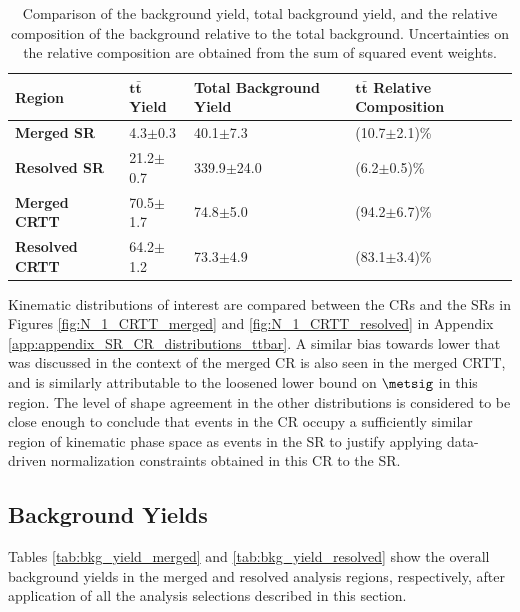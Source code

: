 \begin{table}[htbp]
    \centering
    \caption{Comparison of the \ttbar background yield, total background yield, and the relative composition of the \ttbar background relative to the total background. Uncertainties on the relative composition are obtained from the sum of squared event weights.}
    \begin{tabular}{l l l l}
      \toprule
     \textbf{Region} & \(\boldsymbol{t\bar{t}}\)\textbf{ Yield} & \textbf{Total Background Yield} & \(\boldsymbol{t\bar{t}}\)\textbf{ Relative Composition} \\
      \midrule
      \midrule
      \textbf{Merged SR} & 4.3\(\pm\)0.3 & 40.1\(\pm\)7.3 & (10.7\(\pm\)2.1)\%  \tabularnewline
      \midrule
      \textbf{Resolved SR} & 21.2\(\pm\)0.7 & 339.9\(\pm\)24.0 & (6.2\(\pm\)0.5)\% \tabularnewline
      \midrule
      \textbf{Merged CRTT} & 70.5\(\pm\)1.7 & 74.8\(\pm\)5.0 & (94.2\(\pm\)6.7)\% \tabularnewline
      \midrule
      \textbf{Resolved CRTT} & 64.2\(\pm\)1.2 & 73.3\(\pm\)4.9 & (83.1\(\pm\)3.4)\% \tabularnewline
      \bottomrule
    \end{tabular}
    \label{tab:ttbar_cr_yields}
\end{table}

Kinematic distributions of interest are compared between the \ttbar CRs and the SRs in Figures \ref{fig:N_1_CRTT_merged} and \ref{fig:N_1_CRTT_resolved} in Appendix \ref{app:appendix_SR_CR_distributions_ttbar}. A similar bias towards lower \met that was discussed in the context of the merged \wjets CR is also seen in the merged CRTT, and is similarly attributable to the loosened lower bound on \(\metsig\) in this region. The level of shape agreement in the other distributions is considered to be close enough to conclude that events in the \ttbar CR occupy a sufficiently similar region of kinematic phase space as events in the SR to justify applying data-driven \ttbar normalization constraints obtained in this CR to the SR.

\subsection{Background Yields}
\label{ap:bkg_yields}

Tables \ref{tab:bkg_yield_merged} and \ref{tab:bkg_yield_resolved} show the overall background yields in the merged and resolved analysis regions, respectively, after application of all the analysis selections described in this section.

